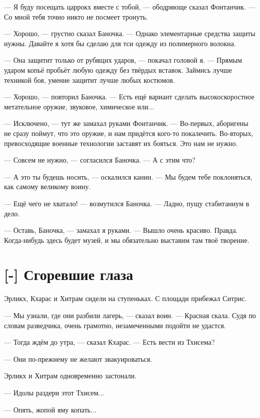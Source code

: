 --- Я буду посещать царрокх вместе с тобой, --- ободряюще сказал Фонтанчик.
--- Со мной тебя точно никто не посмеет тронуть.

--- Хорошо, --- грустно сказал Баночка.
--- Однако элементарные средства защиты нужны.
Давайте я хотя бы сделаю для тси одежду из полимерного волокна.

--- Она защитит только от рубящих ударов, --- покачал головой я.
--- Прямым ударом копьё пробьёт любую одежду без твёрдых вставок.
Займись лучше техникой боя, умение защитит лучше любых костюмов.

--- Хорошо, --- повторил Баночка.
--- Есть ещё вариант сделать высокоскоростное метательное оружие, звуковое, химическое или...

--- Исключено, --- тут же замахал руками Фонтанчик.
--- Во-первых, аборигены не сразу поймут, что это оружие, и нам придётся кого-то покалечить.
Во-вторых, превосходящие военные технологии заставят их бояться.
Это нам не нужно.

--- Совсем не нужно, --- согласился Баночка.
--- А с этим что?

--- А это ты будешь носить, --- оскалился канин.
--- Мы будем тебе поклоняться, как самому великому воину.

--- Ещё чего не хватало! --- возмутился Баночка.
--- Ладно, пущу стабитаниум в дело.

--- Оставь, Баночка, --- замахал я руками.
--- Вышло очень красиво.
Правда.
Когда-нибудь здесь будет музей, и мы обязательно выставим там твоё творение.

\section{[-] Сгоревшие глаза}

\textspace

Эрликх, Кхарас и Хитрам сидели на ступеньках.
С площади прибежал Ситрис.

--- Мы узнали, где они разбили лагерь, --- сказал воин.
--- Красная скала.
Судя по словам разведчика, очень грамотно, незамеченными подойти не удастся.

--- Тогда ждём до утра, --- сказал Кхарас.
--- Есть вести из Тхисема?

--- Они по-прежнему не желают эвакуироваться.

Эрликх и Хитрам одновременно застонали.

--- Идолы раздери этот Тхисем...

--- Опять, жопой яму копать...

